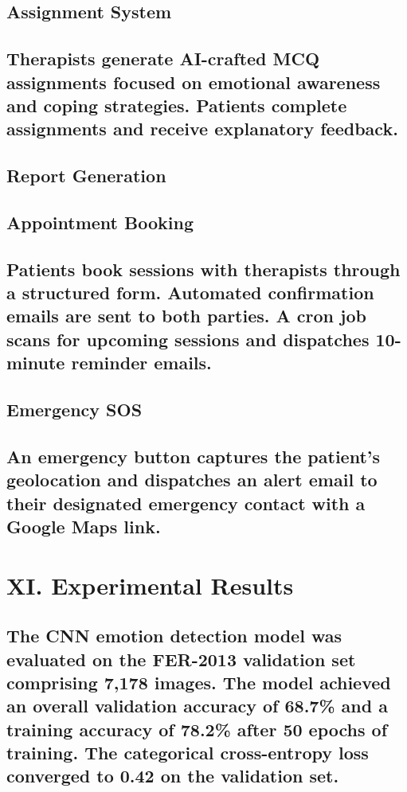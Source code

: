 \documentclass[conference]{IEEEtran}
\begin{document}
\subsection{Assignment System}
\subsection{Therapists generate AI-crafted MCQ assignments focused on emotional awareness and coping strategies. Patients complete assignments and receive explanatory feedback.}
\subsection{Report Generation}
\subsection{Appointment Booking}
\subsection{Patients book sessions with therapists through a structured form. Automated confirmation emails are sent to both parties. A cron job scans for upcoming sessions and dispatches 10-minute reminder emails.}
\subsection{Emergency SOS}
\subsection{An emergency button captures the patient's geolocation and dispatches an alert email to their designated emergency contact with a Google Maps link.}
\section{XI. Experimental Results}
\subsection{The CNN emotion detection model was evaluated on the FER-2013 validation set comprising 7,178 images. The model achieved an overall validation accuracy of 68.7\% and a training accuracy of 78.2\% after 50 epochs of training. The categorical cross-entropy loss converged to 0.42 on the validation set.}
\end{document}
